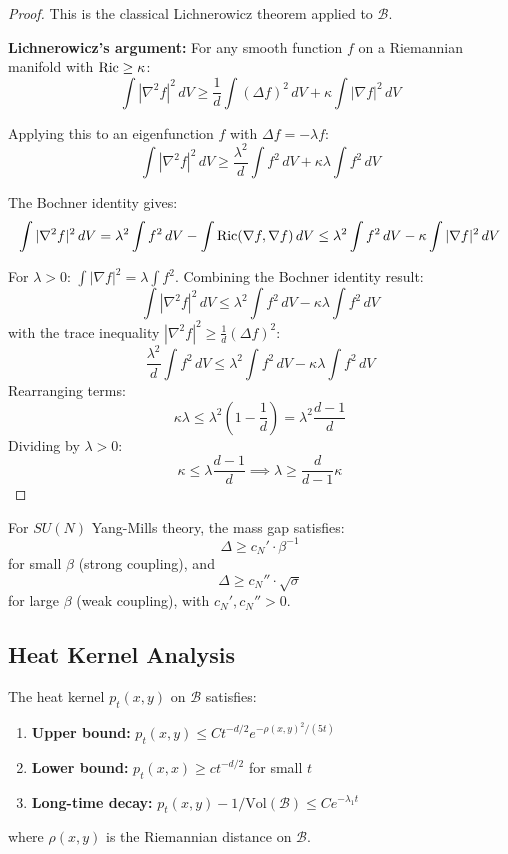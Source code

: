 \begin{proof}
This is the classical Lichnerowicz theorem applied to $\mathcal{B}$.

\textbf{Lichnerowicz's argument:}
For any smooth function $f$ on a Riemannian manifold with $\operatorname{Ric} \geq \kappa$:
\[
\int |\nabla^2 f|^2 \, dV \geq \frac{1}{d} \int (\Delta f)^2 \, dV + \kappa \int |\nabla f|^2 \, dV
\]

Applying this to an eigenfunction $f$ with $\Delta f = -\lambda f$:
\[
\int |\nabla^2 f|^2 \, dV \geq \frac{\lambda^2}{d} \int f^2 \, dV + \kappa \lambda \int f^2 \, dV
\]

The Bochner identity gives:
\[
\int |\nabla^2 f|^2 \, dV = \lambda^2 \int f^2 \, dV - \int \operatorname{Ric}(\nabla f, \nabla f) \, dV
\leq \lambda^2 \int f^2 \, dV - \kappa \int |\nabla f|^2 \, dV
\]

For $\lambda > 0$: $\int |\nabla f|^2 = \lambda \int f^2$. Combining the Bochner identity result:
\[
\int |\nabla^2 f|^2 \, dV \le \lambda^2 \int f^2 \, dV - \kappa \lambda \int f^2 \, dV
\]
with the trace inequality $|\nabla^2 f|^2 \geq \frac{1}{d}(\Delta f)^2$:
\[
\frac{\lambda^2}{d} \int f^2 \, dV \leq \lambda^2 \int f^2 \, dV - \kappa \lambda \int f^2 \, dV
\]
Rearranging terms:
\[
\kappa \lambda \leq \lambda^2 \left(1 - \frac{1}{d}\right) = \lambda^2 \frac{d-1}{d}
\]
Dividing by $\lambda > 0$:
\[
\kappa \leq \lambda \frac{d-1}{d} \implies \lambda \geq \frac{d}{d-1} \kappa
\]
\end{proof}

\begin{corollary}
\label{cor:gap-curvature}
For $SU(N)$ Yang-Mills theory, the mass gap satisfies:
\[
\Delta \geq c_N' \cdot \beta^{-1}
\]
for small $\beta$ (strong coupling), and
\[
\Delta \geq c_N'' \cdot \sqrt{\sigma}
\]
for large $\beta$ (weak coupling), with $c_N', c_N'' > 0$.
\end{corollary}

\subsection{Heat Kernel Analysis}

\begin{theorem}
\label{thm:heat-kernel-gauge}
The heat kernel $p_t(x, y)$ on $\mathcal{B}$ satisfies:
\begin{enumerate}[label=(\roman*)]
\item \textbf{Upper bound:} $p_t(x, y) \leq C t^{-d/2} e^{-\rho(x,y)^2/(5t)}$
\item \textbf{Lower bound:} $p_t(x, x) \geq c t^{-d/2}$ for small $t$
\item \textbf{Long-time decay:} $p_t(x, y) - 1/\text{Vol}(\mathcal{B}) \leq C e^{-\lambda_1 t}$
\end{enumerate}
where $\rho(x,y)$ is the Riemannian distance on $\mathcal{B}$.
\end{theorem}

